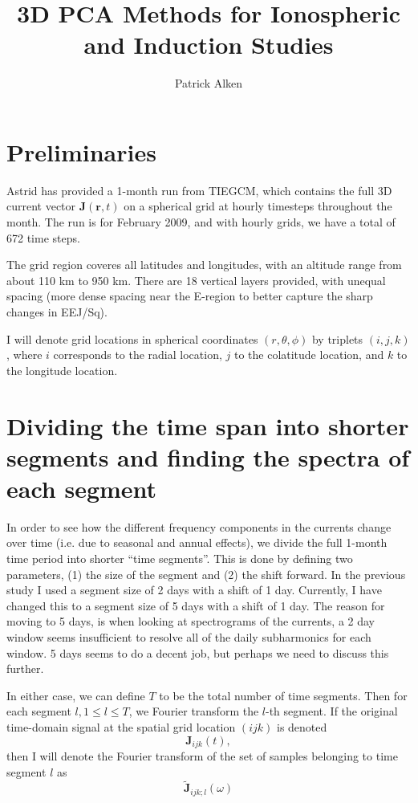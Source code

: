 \documentclass{article}
\begin{document}
\title{3D PCA Methods for Ionospheric and Induction Studies}
\author{Patrick Alken}

\maketitle

\section{Preliminaries}

Astrid has provided a 1-month run from TIEGCM, which contains the full
3D current vector $\mathbf{J}(\mathbf{r},t)$ on a spherical grid at hourly timesteps throughout the month.
The run is for February 2009, and with hourly grids, we have a total of 672
time steps.

The grid region coveres all latitudes and longitudes, with an altitude range from
about 110 km to 950 km. There are 18 vertical layers provided, with unequal spacing
(more dense spacing near the E-region to better capture the sharp changes in EEJ/Sq).

I will denote grid locations in spherical coordinates $(r,\theta,\phi)$ by triplets
$(i,j,k)$, where $i$ corresponds to the radial location, $j$ to the colatitude location,
and $k$ to the longitude location.

\section{Dividing the time span into shorter segments and finding the spectra of each segment}

In order to see how the different frequency components in the currents change over time
(i.e. due to seasonal and annual effects), we divide the full 1-month time period into shorter
``time segments''. This is done by defining two parameters, (1) the size of the segment and
(2) the shift forward. In the previous study I used a segment size of 2 days with a shift of 1 day.
Currently, I have changed this to a segment size of 5 days with a shift of 1 day. The reason for
moving to 5 days, is when looking at spectrograms of the currents, a 2 day window seems insufficient
to resolve all of the daily subharmonics for each window. 5 days seems to do a decent job, but perhaps
we need to discuss this further.

In either case, we can define $T$ to be the total number of time segments. Then for each segment
$l, 1 \le l \le T$, we Fourier transform the $l$-th segment. If the original time-domain signal
at the spatial grid location $(ijk)$ is denoted
$$
\mathbf{J}_{ijk}(t),
$$
then I will denote the Fourier transform of the set of samples belonging to time segment $l$ as
$$
\mathbf{\tilde{J}}_{ijk;l}(\omega)
$$
\end{document}
